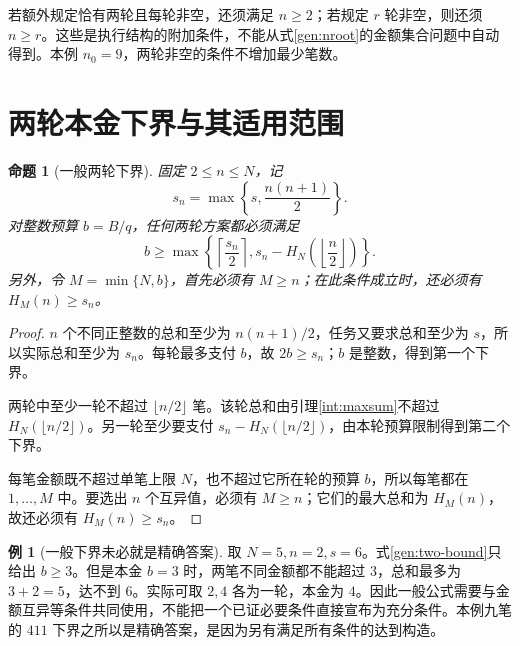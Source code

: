 \documentclass[UTF8,a4paper]{ctexbook}
\newtheorem{proposition}[theorem]{命题}
\theoremstyle{definition}
\newtheorem{example}[theorem]{例}
\numberwithin{equation}{chapter}
\newcommand{\1}{\mathbf{1}}
\begin{document}
若额外规定恰有两轮且每轮非空，还须满足 $n\ge2$；若规定 $r$ 轮非空，则还须 $n\ge r$。这些是执行结构的附加条件，不能从式\eqref{gen:nroot}的金额集合问题中自动得到。本例 $n_0=9$，两轮非空的条件不增加最少笔数。

\section{两轮本金下界与其适用范围}
\begin{proposition}[一般两轮下界]\label{gen:two-lower}
固定 $2\le n\le N$，记
\[
s_n=\max\left\{s,\frac{n(n+1)}2\right\}.
\]
对整数预算 $b=B/q$，任何两轮方案都必须满足
\begin{equation}\label{gen:two-bound}
b\ge\max\left\{
\left\lceil\frac{s_n}{2}\right\rceil,
s_n-H_N\left(\left\lfloor\frac n2\right\rfloor\right)
\right\}.
\end{equation}
另外，令 $M=\min\{N,b\}$，首先必须有 $M\ge n$；在此条件成立时，还必须有 $H_M(n)\ge s_n$。
\end{proposition}
\begin{proof}
$n$ 个不同正整数的总和至少为 $n(n+1)/2$，任务又要求总和至少为 $s$，所以实际总和至少为 $s_n$。每轮最多支付 $b$，故 $2b\ge s_n$；$b$ 是整数，得到第一个下界。

两轮中至少一轮不超过 $\lfloor n/2\rfloor$ 笔。该轮总和由引理\ref{int:maxsum}不超过 $H_N(\lfloor n/2\rfloor)$。另一轮至少要支付 $s_n-H_N(\lfloor n/2\rfloor)$，由本轮预算限制得到第二个下界。

每笔金额既不超过单笔上限 $N$，也不超过它所在轮的预算 $b$，所以每笔都在 $1,\ldots,M$ 中。要选出 $n$ 个互异值，必须有 $M\ge n$；它们的最大总和为 $H_M(n)$，故还必须有 $H_M(n)\ge s_n$。
\end{proof}

\begin{example}[一般下界未必就是精确答案]
取 $N=5,n=2,s=6$。式\eqref{gen:two-bound}只给出 $b\ge3$。但是本金 $b=3$ 时，两笔不同金额都不能超过 $3$，总和最多为 $3+2=5$，达不到 $6$。实际可取 $2,4$ 各为一轮，本金为 $4$。因此一般公式需要与金额互异等条件共同使用，不能把一个已证必要条件直接宣布为充分条件。本例九笔的 $411$ 下界之所以是精确答案，是因为另有满足所有条件的达到构造。
\end{example}
\end{document}

